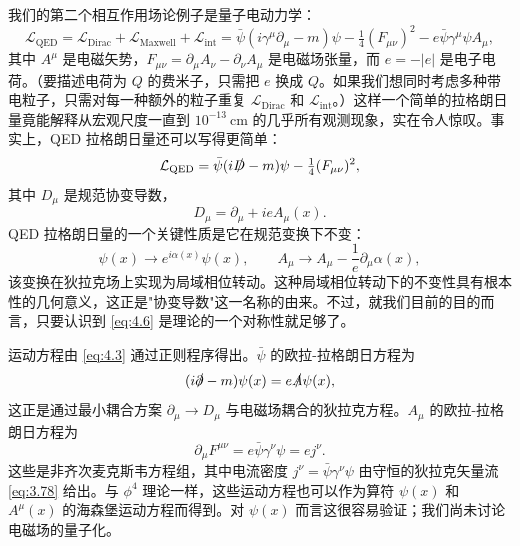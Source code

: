 我们的第二个相互作用场论例子是量子电动力学：
\begin{equation}
  \mathcal{L}_{\mathrm{QED}} = \mathcal{L}_{\mathrm{Dirac}}
    + \mathcal{L}_{\mathrm{Maxwell}} + \mathcal{L}_{\mathrm{int}}
  = \bar{\psi}(i\gamma^\mu\partial_\mu - m)\psi
    - \tfrac{1}{4}(F_{\mu\nu})^2 - e\bar{\psi}\gamma^\mu\psi A_\mu ,
  \label{eq:4.3}
\end{equation}
其中 $A^\mu$ 是电磁矢势，$F_{\mu\nu} = \partial_\mu A_\nu - \partial_\nu A_\mu$ 是电磁场张量，而 $e = -|e|$ 是电子电荷。（要描述电荷为 $Q$ 的费米子，只需把 $e$ 换成 $Q$。如果我们想同时考虑多种带电粒子，只需对每一种额外的粒子重复 $\mathcal{L}_{\mathrm{Dirac}}$ 和 $\mathcal{L}_{\mathrm{int}}$。）这样一个简单的拉格朗日量竟能解释从宏观尺度一直到 $10^{-13}\ \mathrm{cm}$ 的几乎所有观测现象，实在令人惊叹。事实上，QED 拉格朗日量还可以写得更简单：
\begin{equation}
  \mathcal{L}_{\mathrm{QED}} = \bar{\psi}(i\slashed{D} - m)\psi
    - \tfrac{1}{4}(F_{\mu\nu})^2 ,
  \label{eq:4.4}
\end{equation}
其中 $D_\mu$ 是规范协变导数，
\begin{equation}
  D_\mu = \partial_\mu + ieA_\mu(x) .
  \label{eq:4.5}
\end{equation}
QED 拉格朗日量的一个关键性质是它在规范变换下不变：
\begin{equation}
  \psi(x) \to e^{i\alpha(x)}\psi(x),\qquad
  A_\mu \to A_\mu - \frac{1}{e}\partial_\mu\alpha(x),
  \label{eq:4.6}
\end{equation}
该变换在狄拉克场上实现为局域相位转动。这种局域相位转动下的不变性具有根本性的几何意义，这正是"协变导数"这一名称的由来。不过，就我们目前的目的而言，只要认识到 \eqref{eq:4.6} 是理论的一个对称性就足够了。

运动方程由 \eqref{eq:4.3} 通过正则程序得出。$\bar{\psi}$ 的欧拉-拉格朗日方程为
\begin{equation}
  (i\slashed{\partial} - m)\psi(x) = e\slashed{A}\psi(x),
  \label{eq:4.7}
\end{equation}
这正是通过最小耦合方案 $\partial_\mu \to D_\mu$ 与电磁场耦合的狄拉克方程。$A_\mu$ 的欧拉-拉格朗日方程为
\begin{equation}
  \partial_\mu F^{\mu\nu} = e\bar{\psi}\gamma^\nu\psi = e j^\nu .
  \label{eq:4.8}
\end{equation}
这些是非齐次麦克斯韦方程组，其中电流密度 $j^\nu = \bar{\psi}\gamma^\nu\psi$ 由守恒的狄拉克矢量流 \eqref{eq:3.78} 给出。与 $\phi^4$ 理论一样，这些运动方程也可以作为算符 $\psi(x)$ 和 $A^\mu(x)$ 的海森堡运动方程而得到。对 $\psi(x)$ 而言这很容易验证；我们尚未讨论电磁场的量子化。

